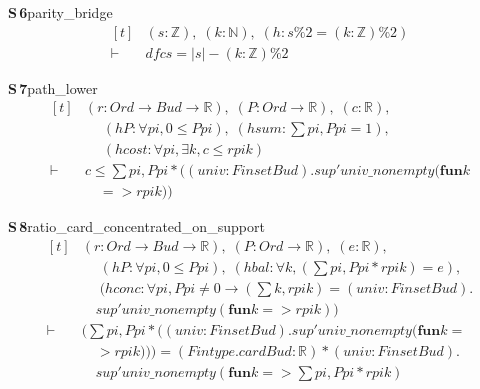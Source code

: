 \documentclass[conference]{IEEEtran}
\theoremstyle{definition}
\newcommand{\lean}[1]{\textsf{\footnotesize #1}}
\begin{document}
\noindent\textbf{S\,6}\quad\lean{parity\_bridge}
{\footnotesize\[ \begin{aligned}[t]
&(\mathit{s} : \mathbb{Z} ),\; (\mathit{k} : \mathbb{N} ),\; (\mathit{h} : \mathit{s} \% 2 = (\mathit{k} : \mathbb{Z} ) \% 2)\\
\vdash\;&\mathit{dfc} \mathit{s} = |\mathit{s}| - (\mathit{k} : \mathbb{Z} ) \% 2
\end{aligned} \]}

\noindent\textbf{S\,7}\quad\lean{path\_lower}
{\footnotesize\[ \begin{aligned}[t]
&(\mathit{r} : \mathit{Ord} \to \mathit{Bud} \to \mathbb{R} ),\; (\mathit{P} : \mathit{Ord} \to \mathbb{R} ),\; (\mathit{c} : \mathbb{R} ),\\
&\quad \; (\mathit{hP} : \forall \mathit{pi}, 0 \leq \mathit{P} \mathit{pi}),\; (\mathit{hsum} : \textstyle\sum \mathit{pi}, \mathit{P} \mathit{pi} = 1),\\
&\quad \; (\mathit{hcost} : \forall \mathit{pi}, \exists \mathit{k}, \mathit{c} \leq \mathit{r} \mathit{pi} \mathit{k})\\
\vdash\;&\mathit{c} \leq \textstyle\sum \mathit{pi}, \mathit{P} \mathit{pi} * ((\mathit{univ} : \mathit{Finset} \mathit{Bud}).\mathit{sup'} \mathit{univ\_nonempty} (\mathbf{fun} \mathit{k}\\
&\quad => \mathit{r} \mathit{pi} \mathit{k}))
\end{aligned} \]}

\noindent\textbf{S\,8}\quad\lean{ratio\_card\_concentrated\_on\_support}
{\footnotesize\[ \begin{aligned}[t]
&(\mathit{r} : \mathit{Ord} \to \mathit{Bud} \to \mathbb{R} ),\; (\mathit{P} : \mathit{Ord} \to \mathbb{R} ),\; (\mathit{e} : \mathbb{R} ),\\
&\quad \; (\mathit{hP} : \forall \mathit{pi}, 0 \leq \mathit{P} \mathit{pi}),\; (\mathit{hbal} : \forall \mathit{k}, (\textstyle\sum \mathit{pi}, \mathit{P} \mathit{pi} * \mathit{r} \mathit{pi} \mathit{k}) = \mathit{e}),\\
&\quad \; (\mathit{hconc} : \forall \mathit{pi}, \mathit{P} \mathit{pi} \neq 0 \to (\textstyle\sum \mathit{k}, \mathit{r} \mathit{pi} \mathit{k}) = (\mathit{univ} : \mathit{Finset} \mathit{Bud}).\\
&\quad \mathit{sup'} \mathit{univ\_nonempty} (\mathbf{fun} \mathit{k} => \mathit{r} \mathit{pi} \mathit{k}))\\
\vdash\;&(\textstyle\sum \mathit{pi}, \mathit{P} \mathit{pi} * ((\mathit{univ} : \mathit{Finset} \mathit{Bud}).\mathit{sup'} \mathit{univ\_nonempty} (\mathbf{fun} \mathit{k} =\\
&\quad > \mathit{r} \mathit{pi} \mathit{k}))) = (\mathit{Fintype}.\mathit{card} \mathit{Bud} : \mathbb{R} ) * (\mathit{univ} : \mathit{Finset} \mathit{Bud}).\\
&\quad \mathit{sup'} \mathit{univ\_nonempty} (\mathbf{fun} \mathit{k} => \textstyle\sum \mathit{pi}, \mathit{P} \mathit{pi} * \mathit{r} \mathit{pi} \mathit{k})
\end{aligned} \]}
\end{document}
